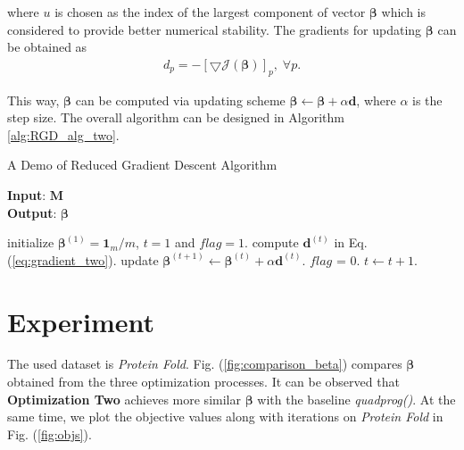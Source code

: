 \documentclass{article}
\begin{document}
where $u$ is chosen as the index of the largest component of vector $\boldsymbol{\beta}$ which is considered to provide better numerical stability.
The gradients for updating $\boldsymbol{\beta}$ can be obtained as 
\begin{equation}\label{eq:gradient_two}
	\begin{split}
		d_p = - [\bigtriangledown \mathcal{J}(\boldsymbol{\beta})]_p,\; \forall p.
	\end{split}
\end{equation}


This way, $\boldsymbol{\beta}$ can be computed via updating scheme $\boldsymbol{\beta} \leftarrow \boldsymbol{\beta} + \alpha \mathbf{d}$, where $\alpha$ is the step size.
The overall algorithm can be designed in Algorithm \ref{alg:RGD_alg_two}.


\begin{algorithm}[h]
\caption{A Demo of Reduced Gradient Descent Algorithm}
\label{alg:RGD_alg_two}
\textbf{Input}: $\mathbf{M}$\\
\textbf{Output}: $\boldsymbol{\beta}$
\begin{algorithmic}[1] %
\STATE initialize $\boldsymbol{\beta}^{(1)}=\mathbf{1}_m/m$, $t=1$ and $flag=1$.
  \STATE compute $\mathbf{d}^{(t)}$ in Eq. (\ref{eq:gradient_two}).
  \STATE update $\boldsymbol{\beta}^{(t+1)} \leftarrow \boldsymbol{\beta}^{(t)} + \alpha \mathbf{d}^{(t)}$.
  		\STATE $flag$ = 0.
  \ENDIF
  \STATE $t \leftarrow t+1$.
\ENDWHILE
\end{algorithmic}
\end{algorithm}



\section{Experiment}

The used dataset is \emph{Protein Fold}.
Fig. (\ref{fig:comparison_beta}) compares $\boldsymbol{\beta}$ obtained from the three optimization processes. 
It can be observed that \textbf{Optimization Two} achieves more similar $\boldsymbol{\beta}$ with the baseline \emph{quadprog()}.
At the same time, we plot the objective values along with iterations on \emph{Protein Fold} in Fig. (\ref{fig:objs}).
\end{document}
